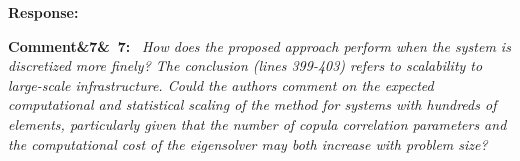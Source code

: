 \documentclass[11pt]{article}
\newenvironment{rcomment}[1]{\par\bigskip\noindent\textbf{Comment\ifx&#1&\else\ #1\fi:}\ \itshape}{\par}
\newenvironment{response}{\par\smallskip\noindent\color{resp}\textbf{Response:}\ }{\par}
\begin{document}
\begin{response}
\end{response}

\begin{rcomment}{7}
How does the proposed approach perform when the system is discretized more finely? The conclusion (lines 399-403)
refers to scalability to large-scale infrastructure. Could the authors comment on the expected computational and  statistical scaling of the method for systems with hundreds of elements, particularly given that the number of copula correlation parameters and the computational cost of the eigensolver may both increase with problem size?
\end{rcomment}

%
\end{document}

